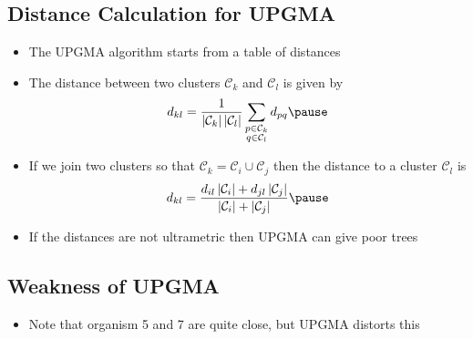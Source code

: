 \begin{slide}
\section[-2]{Distance Calculation for UPGMA}

\begin{PauseHighLight}
  \begin{itemize}
  \item The UPGMA algorithm starts from a table of distances\pause
  \item The distance between two clusters $\mathcal{C}_k$ and
    $\mathcal{C}_l$ is given by
    \begin{align*}
      d_{kl} = \frac{1}{|\mathcal{C}_k|\,|\mathcal{C}_l|}
      \sum_{\substack{p\in\mathcal{C}_k\\q\in\mathcal{C}_l}} d_{pq}\pause
    \end{align*}
  \item If we join two clusters so that $\mathcal{C}_k = \mathcal{C}_i
    \cup \mathcal{C}_j$ then the distance to a cluster $\mathcal{C}_l$
    is
    \begin{align*}
      d_{kl} = \frac{d_{il}\,|\mathcal{C}_i| + d_{jl}\,|\mathcal{C}_j|}
      {|\mathcal{C}_i| + |\mathcal{C}_j|}\pause
    \end{align*}
  \item If the distances are not ultrametric then UPGMA can give poor
    trees\pause
  \end{itemize}
\end{PauseHighLight}

\end{slide}


\begin{slide}
\section[-2]{Weakness of UPGMA}
\pause
\pb
{}
\begin{itemize}
\item Note that organism 5 and 7 are quite close, but UPGMA distorts
  this\pauseh 
\end{itemize}
\begin{center}
  \pause
\end{center}

\end{slide}

